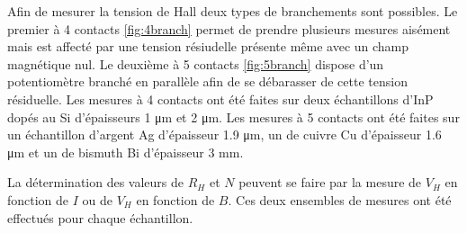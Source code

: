 \begin{minipage}{\textwidth}
    Afin de mesurer la tension de Hall deux types de branchements sont possibles. Le premier à 4 contacts \autoref{fig:4branch} permet de prendre plusieurs mesures aisément mais est affecté par une tension résiudelle présente même avec un champ magnétique nul. Le deuxième à 5 contacts \autoref{fig:5branch} dispose d'un potentiomètre branché en parallèle afin de se débarasser de cette tension résiduelle. Les mesures à 4 contacts ont été faites sur deux échantillons d'InP dopés au Si d'épaisseurs 1 \si{\micro\meter} et 2 \si{\micro\meter}. Les mesures à 5 contacts ont été faites sur un échantillon d'argent Ag d'épaisseur 1.9 \si{\micro \meter}, un de cuivre Cu d'épaisseur 1.6 \si{\micro \meter} et un de bismuth Bi d'épaisseur 3 \si{\milli \meter}.

    La détermination des valeurs de \(R_H\) et \(N\) peuvent se faire par la mesure de \(V_H\) en fonction de \(I\) ou de \(V_H\) en fonction de \(B\). Ces deux ensembles de mesures ont été effectués pour chaque échantillon.
    
\end{minipage}